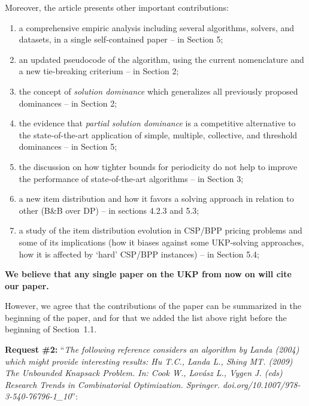 \documentclass{elsarticle}
\begin{document}
Moreover, the article presents other important contributions:
\begin{enumerate}
\item a comprehensive empiric analysis including several algorithms, solvers, and datasets, in a single self-contained paper -- in Section 5;
\item an updated pseudocode of the algorithm, using the current nomenclature and a new tie-breaking criterium -- in Section 2;
\item the concept of \emph{solution dominance} which generalizes all previously proposed dominances -- in Section 2;
\item the evidence that \emph{partial solution dominance} is a competitive alternative to the state-of-the-art application of simple, multiple, collective, and threshold dominances -- in Section 5;
\item the discussion on how tighter bounds for periodicity do not help to improve the performance of state-of-the-art algorithms -- in Section 3;
\item a new item distribution and how it favors a solving approach in relation to other (B\&B over DP) -- in sections 4.2.3 and 5.3;
\item a study of the item distribution evolution in CSP/BPP pricing problems and some of its implications (how it biases against some UKP-solving approaches, how it is affected by `hard' CSP/BPP instances) -- in Section 5.4;
\end{enumerate}

\textbf{We believe that any single paper on the UKP from now on will cite our paper.}

However, we agree that the contributions of the paper can be summarized in the beginning of the paper, and for that we added the list above right before the beginning of Section~1.1.

\bigskip

\textbf{Request \#2:} ``\textit{The following reference considers an algorithm by Landa (2004) which might provide interesting results: Hu T.C., Landa L., Shing MT. (2009) The Unbounded Knapsack Problem. In: Cook W., Lovász L., Vygen J. (eds) Research Trends in Combinatorial Optimization. Springer. doi.org/10.1007/978-3-540-76796-1\_10}'':
\end{document}
